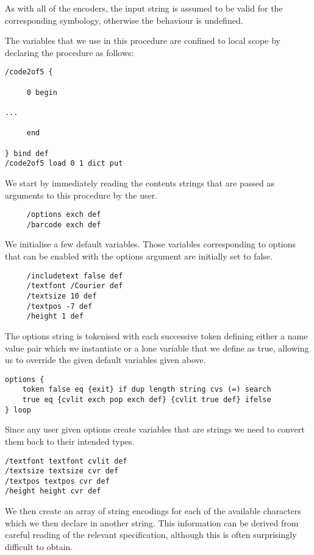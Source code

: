 \documentclass{article}
\begin{document}
As with all of the encoders, the input string is assumed to be valid for
the corresponding symbology, otherwise the behaviour is undefined.

The variables that we use in this procedure are confined to local
scope by declaring the procedure as follows:

\begin{lstlisting}
/code2of5 {
 
     0 begin

...

     end

} bind def
/code2of5 load 0 1 dict put
\end{lstlisting}

We start by immediately reading the contents strings that are passed as
arguments to this procedure by the user.

\begin{lstlisting}
     /options exch def
     /barcode exch def
\end{lstlisting}

We initialise a few default variables. Those variables corresponding to 
options that can be enabled with the options argument are initially
set to false.

\begin{lstlisting}
     /includetext false def 
     /textfont /Courier def
     /textsize 10 def
     /textpos -7 def
     /height 1 def
\end{lstlisting}

The options string is tokenised with each successive token defining either a
name value pair which we instantiate or a lone variable that we define as true, 
allowing us to override the given default variables given above.

\begin{lstlisting}
options {
    token false eq {exit} if dup length string cvs (=) search
    true eq {cvlit exch pop exch def} {cvlit true def} ifelse
} loop
\end{lstlisting}      

Since any user given options create variables that are strings we need to convert
them back to their intended types.

\begin{lstlisting}
/textfont textfont cvlit def
/textsize textsize cvr def
/textpos textpos cvr def
/height height cvr def	     
\end{lstlisting}

We then create an array of string encodings for each of the available
characters which we then declare in another string. This information
can be derived from careful reading of the relevant specification, 
although this is often surprisingly difficult to obtain. 
\end{document}
